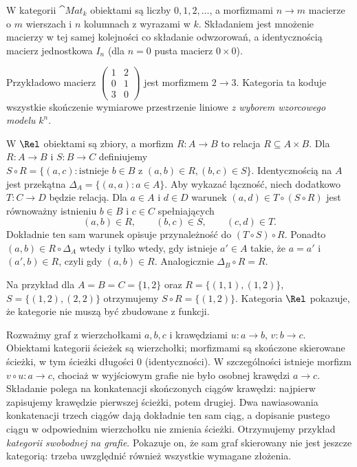 \begin{przyklad}\label{przyklad:mat}
W kategorii $\cat{Mat}_k$ obiektami są liczby $0,1,2,\ldots$, a morfizmami $n\to m$ macierze o $m$ wierszach i $n$ kolumnach z wyrazami w $k$. Składaniem jest mnożenie macierzy w tej samej kolejności co składanie odwzorowań, a identycznością macierz jednostkowa $I_n$ (dla $n=0$ pusta macierz $0\times0$).

Przykładowo macierz $\begin{pmatrix}1&2\\0&1\\3&0\end{pmatrix}$ jest morfizmem $2\to3$. Kategoria ta koduje wszystkie skończenie wymiarowe przestrzenie liniowe \emph{z wyborem wzorcowego modelu} $k^n$.
\end{przyklad}

\begin{przyklad}
W $\Rel$ obiektami są zbiory, a morfizm $R:A\to B$ to relacja $R\subseteq A\times B$. Dla $R:A\to B$ i $S:B\to C$ definiujemy $S\circ R=\{(a,c):\text{istnieje }b\in B\text{ z }(a,b)\in R,(b,c)\in S\}$. Identycznością na $A$ jest przekątna $\Delta_A=\{(a,a):a\in A\}$. Aby wykazać łączność, niech dodatkowo $T:C\to D$ będzie relacją. Dla $a\in A$ i $d\in D$ warunek $(a,d)\in T\circ(S\circ R)$ jest równoważny istnieniu $b\in B$ i $c\in C$ spełniających
\[
(a,b)\in R,\qquad (b,c)\in S,\qquad (c,d)\in T.
\]
Dokładnie ten sam warunek opisuje przynależność do $(T\circ S)\circ R$. Ponadto $(a,b)\in R\circ\Delta_A$ wtedy i tylko wtedy, gdy istnieje $a'\in A$ takie, że $a=a'$ i $(a',b)\in R$, czyli gdy $(a,b)\in R$. Analogicznie $\Delta_B\circ R=R$.

Na przykład dla $A=B=C=\{1,2\}$ oraz $R=\{(1,1),(1,2)\}$, $S=\{(1,2),(2,2)\}$ otrzymujemy $S\circ R=\{(1,2)\}$. Kategoria $\Rel$ pokazuje, że kategorie nie muszą być zbudowane z funkcji.
\end{przyklad}


\begin{przyklad}\label{przyklad:sciezki}
Rozważmy graf z wierzchołkami $a,b,c$ i krawędziami $u:a\to b$, $v:b\to c$. Obiektami kategorii ścieżek są wierzchołki; morfizmami są skończone skierowane ścieżki, w tym ścieżki długości $0$ (identyczności). W szczególności istnieje morfizm $v\circ u:a\to c$, chociaż w wyjściowym grafie nie było osobnej krawędzi $a\to c$. Składanie polega na konkatenacji skończonych ciągów krawędzi: najpierw zapisujemy krawędzie pierwszej ścieżki, potem drugiej. Dwa nawiasowania konkatenacji trzech ciągów dają dokładnie ten sam ciąg, a dopisanie pustego ciągu w odpowiednim wierzchołku nie zmienia ścieżki. Otrzymujemy przykład \emph{kategorii swobodnej na grafie}. Pokazuje on, że sam graf skierowany nie jest jeszcze kategorią: trzeba uwzględnić również wszystkie wymagane złożenia.
\end{przyklad}

